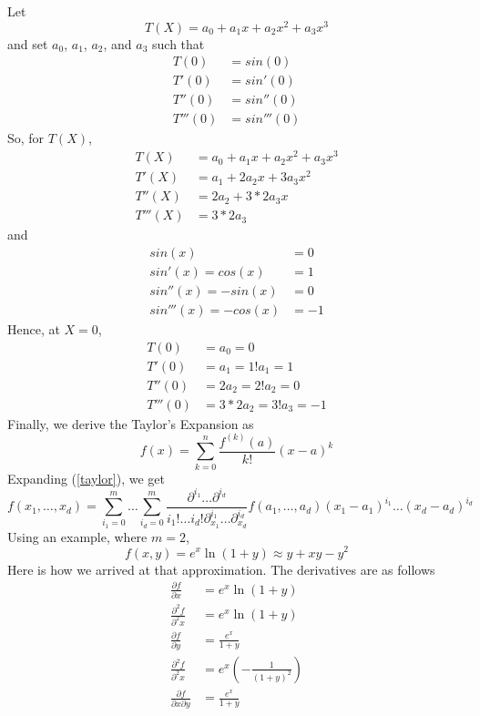 \documentclass[12pt]{extarticle}
\newcommand{\<}{\langle}
\renewcommand{\>}{\rangle}
\theoremstyle{definition}
\begin{document}
\noindent Let
\begin{equation}
    T(X) = a_0 + a_1 x + a_2 x^2 + a_3 x^3
\end{equation}
and set $a_0$, $a_1$, $a_2$, and $a_3$ such that
\begin{align*}
    T(0) &= sin(0)\\
    T'(0) &= sin'(0)\\
    T''(0) &= sin''(0)\\
    T'''(0) &= sin'''(0)
\end{align*}
So, for $T(X)$,
\begin{align*}
    T(X) &= a_0 + a_1 x + a_2 x^2 + a_3 x^3\\
    T'(X) &= a_1 + 2a_2 x + 3a_3 x^2\\
    T''(X) &= 2a_2 + 3*2a_3 x\\
    T'''(X) &= 3*2a_3
\end{align*}
and
\begin{align*}
    sin(x) &= 0\\
    sin'(x) = cos(x) &= 1\\
    sin''(x) = -sin(x) &= 0\\
    sin'''(x) = -cos(x) &= -1
\end{align*}
Hence, at $X = 0$,
\begin{align*}
    T(0) &= a_0 = 0\\
    T'(0) &= a_1 = 1!a_1 = 1\\
    T''(0) &= 2a_2 = 2!a_2 = 0\\
    T'''(0) &= 3*2a_2 = 3!a_3 = -1
\end{align*}
Finally, we derive the Taylor's Expansion as
\begin{equation}
    f(x) = \sum_{k = 0}^n \frac{f^{(k)}(a)}{k!}(x - a)^k \label{taylor}
\end{equation}
Expanding (\ref{taylor}), we get
\begin{equation}
    f(x_1, \dots, x_d) = \sum_{i_1 = 0}^m \dots \sum_{i_d = 0}^m \frac{\partial^{i_1} \dots \partial^{i_d}}{i_1!\dots i_d! \partial_{x_1}^{i_1}\dots \partial_{x_d}^{i_d}} f(a_1, \dots, a_d)(x_1 - a_1)^{i_1}\dots(x_d - a_d)^{i_d}
\end{equation}
Using an example, where $m = 2$,
\begin{equation}
    f(x, y) = e^x \ln(1 + y) \approx y + xy - y^2
\end{equation}
Here is how we arrived at that approximation. The derivatives are as follows
\begin{align}
    \frac{\partial f}{\partial x} &= e^x \ln(1 + y)\\
    \frac{\partial^2 f}{\partial^2 x} &= e^x \ln(1 + y)\\
    \frac{\partial f}{\partial y} &= \frac{e^x}{1 + y}\\
    \frac{\partial^2 f}{\partial^2 x} &= e^x \left( -\frac{1}{(1 + y)^2}\right)\\
    \frac{\partial f}{\partial x \partial y} &= \frac{e^x}{1 + y}\\
\end{align}
\end{document}
